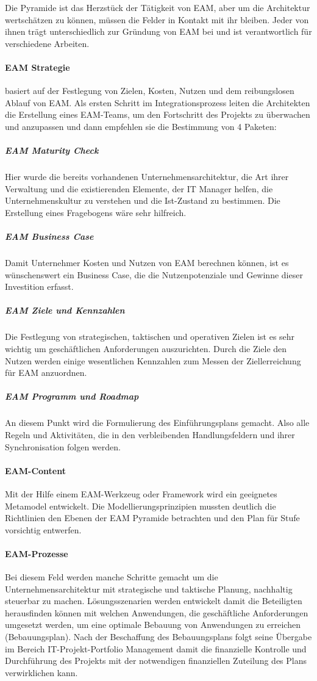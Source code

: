 \documentclass[doc]{apa6}
\begin{document}
Die Pyramide ist das Herzstück der Tätigkeit von EAM, aber um die Architektur wertschätzen zu können, müssen die Felder in Kontakt mit ihr bleiben. Jeder von ihnen trägt unterschiedlich zur Gründung von EAM bei und ist verantwortlich für verschiedene Arbeiten.


\paragraph{EAM Strategie}
basiert auf der Festlegung von Zielen, Kosten, Nutzen und dem reibungslosen Ablauf von EAM. Als ersten Schritt im Integrationsprozess leiten die Architekten die Erstellung eines EAM-Teams, um den Fortschritt des Projekts zu überwachen und anzupassen und dann empfehlen sie die Bestimmung von 4 Paketen:

\subparagraph{EAM Maturity Check}
Hier wurde die bereits vorhandenen Unternehmensarchitektur, die Art ihrer Verwaltung und die existierenden Elemente, der IT Manager helfen, die Unternehmenskultur zu verstehen und die Ist-Zustand zu bestimmen. Die Erstellung eines Fragebogens wäre sehr hilfreich.

\subparagraph{EAM Business Case}
Damit Unternehmer Kosten und Nutzen von EAM berechnen können, ist es wünschenswert ein Business Case, die die Nutzenpotenziale und Gewinne dieser Investition erfasst.

\subparagraph{EAM Ziele und Kennzahlen}
Die Festlegung von strategischen, taktischen und operativen Zielen ist es sehr wichtig um geschäftlichen Anforderungen auszurichten. Durch die Ziele den Nutzen werden einige wesentlichen Kennzahlen zum Messen der Ziellerreichung für EAM anzuordnen.

\subparagraph{EAM Programm und Roadmap}
An diesem Punkt wird die Formulierung des Einführungsplans gemacht. Also alle Regeln und Aktivitäten, die in den verbleibenden Handlungsfeldern und ihrer Synchronisation folgen werden.

\paragraph{EAM-Content} Mit der Hilfe einem EAM-Werkzeug oder Framework wird ein geeignetes Metamodel entwickelt. Die Modellierungsprinzipien mussten deutlich die Richtlinien den Ebenen der EAM Pyramide betrachten und den Plan für Stufe vorsichtig entwerfen.

\paragraph{EAM-Prozesse} Bei diesem Feld werden manche Schritte gemacht um die Unternehmensarchitektur mit strategische und taktische Planung, nachhaltig steuerbar zu machen. Lösungsszenarien werden entwickelt damit die Beteiligten herausfinden können mit welchen Anwendungen, die geschäftliche Anforderungen umgesetzt werden, um eine optimale Bebauung von Anwendungen zu erreichen (Bebauungsplan).  Nach der Beschaffung des Bebauungsplans folgt seine Übergabe im Bereich IT-Projekt-Portfolio Management damit die finanzielle Kontrolle und Durchführung des Projekts mit der notwendigen finanziellen Zuteilung des Plans verwirklichen kann.
\end{document}
